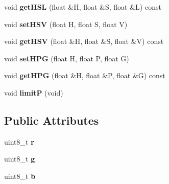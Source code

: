 \begin{DoxyCompactItemize}
\item 
void {\bfseries get\+H\+SL} (float \&H, float \&S, float \&L) const \hypertarget{classPxRGB_afab173643b4cdcef2d603ccb92e9110d}{}\label{classPxRGB_afab173643b4cdcef2d603ccb92e9110d}

\item 
void {\bfseries set\+H\+SV} (float H, float S, float V)\hypertarget{classPxRGB_a4fe5b00cf4e046da478bac0276f9da39}{}\label{classPxRGB_a4fe5b00cf4e046da478bac0276f9da39}

\item 
void {\bfseries get\+H\+SV} (float \&H, float \&S, float \&V) const \hypertarget{classPxRGB_add681111df174de65609233ec85186d5}{}\label{classPxRGB_add681111df174de65609233ec85186d5}

\item 
void {\bfseries set\+H\+PG} (float H, float P, float G)\hypertarget{classPxRGB_a4d78b24d608111ab3b1f79b29e1c6b32}{}\label{classPxRGB_a4d78b24d608111ab3b1f79b29e1c6b32}

\item 
void {\bfseries get\+H\+PG} (float \&H, float \&P, float \&G) const \hypertarget{classPxRGB_ac2cdbc34f590bc4954bb97b342b931f2}{}\label{classPxRGB_ac2cdbc34f590bc4954bb97b342b931f2}

\item 
void {\bfseries limitP} (void)\hypertarget{classPxRGB_acc6f4035316c015975b7f9cfce1c9df2}{}\label{classPxRGB_acc6f4035316c015975b7f9cfce1c9df2}

\end{DoxyCompactItemize}
\subsection*{Public Attributes}
\begin{DoxyCompactItemize}
\item 
uint8\+\_\+t {\bfseries r}\hypertarget{classPxRGB_a43b6680225623e0055996e7861dceea8}{}\label{classPxRGB_a43b6680225623e0055996e7861dceea8}

\item 
uint8\+\_\+t {\bfseries g}\hypertarget{classPxRGB_ae957146c6787c953c244f9e602e550f9}{}\label{classPxRGB_ae957146c6787c953c244f9e602e550f9}

\item 
uint8\+\_\+t {\bfseries b}\hypertarget{classPxRGB_a62310a2f0c5c4e972b414cce2ad5d216}{}\label{classPxRGB_a62310a2f0c5c4e972b414cce2ad5d216}

\end{DoxyCompactItemize}
